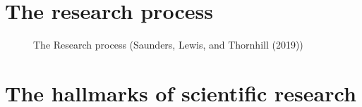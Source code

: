 \documentclass[
  letterpaper,
  DIV=11,
  numbers=noendperiod]{scrreprt}
\begin{document}
\section{The research process}\label{the-research-process}

\begin{figure}


\caption{\label{fig-res_process}The Research process (Saunders, Lewis,
and Thornhill (2019))}

\end{figure}%

\section{The hallmarks of scientific
research}\label{the-hallmarks-of-scientific-research}
\end{document}
